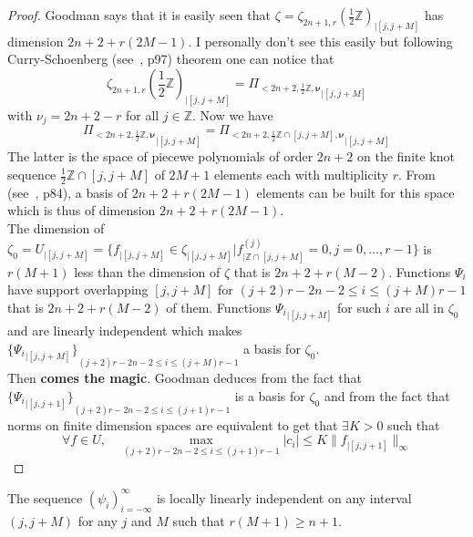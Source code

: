 \documentclass[a4paper, 11pt]{article}
\begin{document}
\begin{proof}
  Goodman says that it is easily seen that $\zeta = \zeta_{2n+1,r}{(\frac{1}{2}\mathbb{Z})}_{|[j,j+M]}$ has dimension 
  $2n+2+r(2M-1)$. I personally don't see this easily but following Curry-Schoenberg (see~\cite{DeBoor}, p97) theorem one 
  can notice that
  \begin{equation*}
    \zeta_{2n+1,r}{(\frac{1}{2}\mathbb{Z})}_{|[j,j+M]} = {\Pi_{<2n+2, \frac{1}{2}\mathbb{Z}, \bm{\nu}}}_{|[j,j+M]}
  \end{equation*}
  with $\nu_j = 2n+2-r$ for all $j \in \mathbb{Z}$. Now we have
  \begin{equation*}
    {\Pi_{<2n+2, \frac{1}{2}\mathbb{Z}, \bm{\nu}}}_{|[j,j+M]} = {\Pi_{<2n+2, \frac{1}{2}\mathbb{Z}\cap[j,j+M], 
    \bm{\nu}}}_{|[j,j+M]}
  \end{equation*}
  The latter is the space of piecewe polynomials of order $2n+2$ on the finite knot sequence 
  $\frac{1}{2}\mathbb{Z}\cap[j,j+M]$ of $2M+1$ elements each with multiplicity $r$. From (see~\cite{DeBoor}, p84), a
  basis of $2n+2 + r(2M-1)$ elements can be built for this space which is thus of dimension $2n+2 + r(2M-1)$. \\

  The dimension of $\zeta_0 = U_{|[j,j+M]} = \{f_{|[j,j+M]} \in \zeta_{|[j,j+M]} | f^{(j)}_{|\mathbb{Z}\cap[j,j+M]} = 0, 
  j=0,\ldots,r-1\}$ is $r(M+1)$ less than the dimension of $\zeta$ that is $2n+2+r(M-2)$. Functions $\Psi_i$ have 
  support overlapping $[j,j+M]$ for $(j+2)r - 2n - 2 \leq i \leq (j+M)r-1$ that is $2n+2+r(M-2)$ of them. Functions 
  ${\Psi_i}_{|[j,j+M]}$ for such $i$ are all in $\zeta_0$ and are linearly independent which makes 
  ${\{{\Psi_i}_{|[j,j+M]}\}}_{(j+2)r - 2n - 2 \leq i \leq (j+M)r-1}$ a basis for $\zeta_0$. \\

  Then \textbf{comes the magic}. Goodman deduces from the fact that ${\{{\Psi_i}_{|[j,j+1]}\}}_{(j+2)r - 2n - 2 \leq i 
  \leq (j+1)r-1}$ is a basis for $\zeta_0$ and from the fact that norms on finite dimension spaces are equivalent to get 
  that $\exists K > 0$ such that
  \begin{equation*}
    \forall f \in U, \quad \max_{(j+2)r - 2n - 2 \leq i \leq (j+1)r-1} |c_i| \leq K \|f_{|[j,j+1]}\|_{\infty}
  \end{equation*}
\end{proof}

\begin{thm}{4.2}
  The sequence ${(\psi_i)}_{i=-\infty}^{\infty}$ is locally linearly independent on any interval $(j, j+M)$ for any $j$ 
  and $M$ such that $r(M+1) \geq n+1$.
\end{thm}
\end{document}
